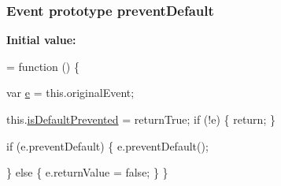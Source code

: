\subsubsection[{\texorpdfstring{prevent\+Default}{preventDefault}}]{ {\bf Event} {\bf prototype} prevent\+Default}\hypertarget{jquery-2_82_81-vsdoc_8js_aafc4d39414b638f56c88573e5f8b4fb4}{}\label{jquery-2_82_81-vsdoc_8js_aafc4d39414b638f56c88573e5f8b4fb4}
{\bfseries Initial value\+:}
\begin{DoxyCode}
= \textcolor{keyword}{function} () \{
        

        var \hyperlink{packages_2bootstrap_83_83_86_2content_2_scripts_2bootstrap_8min_8js_ab5902775854a8b8440bcd25e0fe1c120}{e} = this.originalEvent;

        this.\hyperlink{jquery-2_82_81-vsdoc_8js_af36c584d7af0deb379b8d6e3116775cc}{isDefaultPrevented} = returnTrue;
        \textcolor{keywordflow}{if} (!e) \{
            \textcolor{keywordflow}{return};
        \}

        
        \textcolor{keywordflow}{if} (e.preventDefault) \{
            e.preventDefault();

            
            
        \} \textcolor{keywordflow}{else} \{
            e.returnValue = \textcolor{keyword}{false};
        \}
    \}
\end{DoxyCode}
